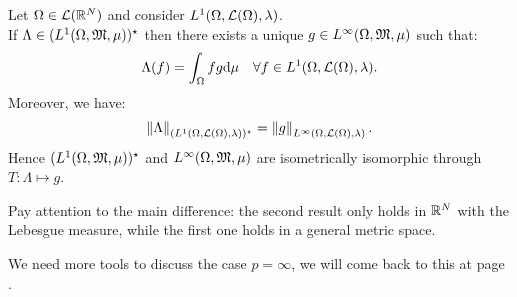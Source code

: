 \begin{theo}\label{theo-duality-l-p-1}
	Let $\Omega \in \mathcal L(\mathbb R^N)$ and consider $L^1(\Omega, \mathcal L(\Omega), \lambda)$.\\
	If $\Lambda \in (L^1(\Omega, \mathfrak M, \mu))^\star$ then there exists a unique $g \in L^\infty(\Omega, \mathfrak M, \mu)$ such that:
	$$\Lambda (f) = \int_\Omega f g \mathrm d \mu \quad \forall f \in L^1(\Omega, \mathcal L(\Omega), \lambda).$$
	Moreover, we have:
	$$\left\lVert\Lambda\right\rVert_{(L^1(\Omega, \mathcal L(\Omega), \lambda))^\star} = \left\lVert g\right\rVert_{L^\infty(\Omega, \mathcal L(\Omega), \lambda)}.$$
	Hence $(L^1(\Omega, \mathfrak M, \mu))^\star$ and $L^\infty(\Omega, \mathfrak M, \mu)$ are isometrically isomorphic through $T: \Lambda \mapsto g$.
\end{theo}

Pay attention to the main difference: the second result only holds in $\mathbb R^N$ with the Lebesgue measure, while the first one holds in a general metric space.

We need more tools to discuss the case $p=\infty$, we will come back to this at page \pageref{paragraph-duality-p-infinity}.
